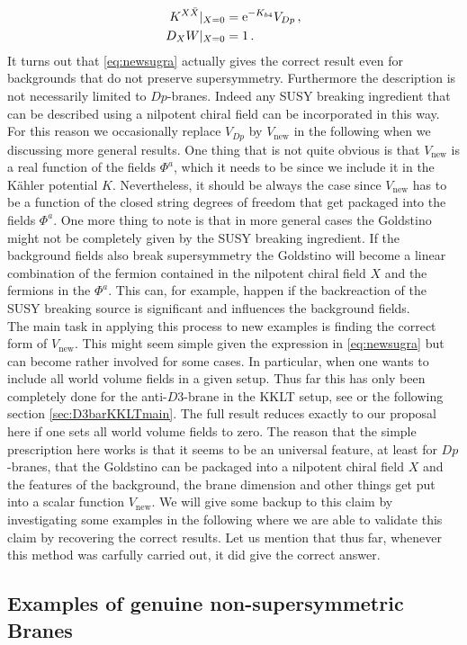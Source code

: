 \documentclass[12pt]{report}
\newcommand{\bea}{\begin{equation}\begin{aligned}}
\newcommand{\eea}{\end{aligned}\end{equation}}
\def\rme{{\rm e}}
\begin{document}
\bea 
K^{X\bar{X}}|_{X=0} &= \rme^{-K_{b4}} V_{Dp}\,,\\
D_X W|_{X=0} &= 1\,.
\eea
It turns out that \eqref{eq:newsugra} actually gives the correct result even for backgrounds that do not preserve supersymmetry. Furthermore the description is not necessarily limited to $Dp$-branes. Indeed any SUSY breaking ingredient that can be described using a nilpotent chiral field can be incorporated in this way. For this reason we occasionally replace $V_{Dp}$ by $V_{\text{new}}$ in the following when we discussing more general results. One thing that is not quite obvious is that $V_{\text{new}}$ is a real function of the fields $\Phi^a$, which it needs to be since we include it in the Kähler potential $K$. Nevertheless, it should be always the case since $V_{\text{new}}$ has to be a function of the closed string degrees of freedom that get packaged into the fields $\Phi^a$. One more thing to note is that in more general cases the Goldstino might not be completely given by the SUSY breaking ingredient. If the background fields also break supersymmetry the Goldstino will become a linear combination of the fermion contained in the nilpotent chiral field $X$ and the fermions in the $\Phi^a$. This can, for example, happen if the backreaction of the SUSY breaking source is significant and influences the background fields.\\
The main task in applying this process to new examples is finding the correct form of $V_{\text{new}}$. This might seem simple given the expression in \eqref{eq:newsugra} but can become rather involved for some cases. In particular, when one wants to include all world volume fields in a given setup. Thus far this has only been completely done for the anti-$D3$-brane in the KKLT setup, see \cite{Cribiori:2019hod} or the following section \ref{sec:D3barKKLTmain}. The full result reduces exactly to our proposal here if one sets all world volume fields to zero. The reason that the simple prescription here works is that it seems to be an universal feature, at least for $Dp$-branes, that the Goldstino can be packaged into a nilpotent chiral field $X$ and the features of the background, the brane dimension and other things get put into a scalar function $V_{\text{new}}$. We will give some backup to this claim by investigating some examples in the following where we are able to validate this claim by recovering the correct results. Let us mention that thus far, whenever this method was carfully carried out, it did give the correct answer.

\subsection{Examples of genuine non-supersymmetric Branes}
\end{document}
